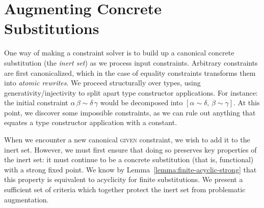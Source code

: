 \documentclass[10pt, letterpaper, oneside]{article}
\newcommand{\given}  {\textsc{given} \xpsace}
\begin{document}
\section{Augmenting Concrete Substitutions}

One way of making a constraint solver is to build up a canonical concrete substitution (the \emph{inert set}) as we process input constraints. Arbitrary constraints are first canonicalized, which in the case of equality constraints transforms them into \emph{atomic rewrites}. We proceed structurally over types, using generativity/injectivity to split apart type constructor applications. For instance: the initial constraint \(\alpha\, \beta \sim \delta\, \gamma\) would be decomposed into \([\alpha \sim \delta,\, \beta \sim \gamma]\). At this point, we discover some impossible constraints, as we can rule out anything that equates a type constructor application with a constant.

When we encounter a new canonical \given constraint, we wish to add it to the inert set. However, we must first ensure that doing so preserves key properties of the inert set: it must continue to be a concrete substitution (that is, functional) with a strong fixed point. We know by Lemma~\ref{lemma:finite-acyclic-strong} that this property is equivalent to acyclicity for finite substitutions. We present a sufficient set of criteria which together protect the inert set from problematic augmentation.

\end{document}
